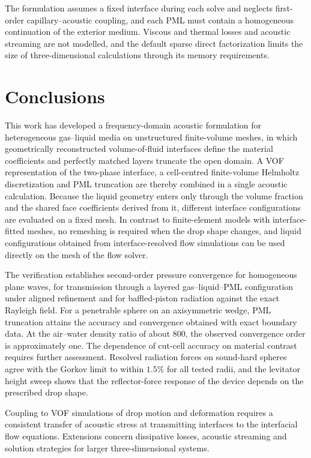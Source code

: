 \documentclass[final,12pt,nopreprintline,longtitle]{elsarticle}
\begin{document}
The formulation assumes a fixed interface during each solve and neglects
first-order capillary--acoustic coupling, and each PML must contain a
homogeneous continuation of the exterior medium.  Viscous and thermal
losses and acoustic streaming are not modelled, and the default sparse direct
factorization limits the size of three-dimensional calculations through its
memory requirements.

\section{Conclusions}
\label{sec:conclusions}

This work has developed a frequency-domain acoustic formulation for
heterogeneous gas--liquid media on unstructured finite-volume meshes, in which
geometrically reconstructed volume-of-fluid interfaces define the material
coefficients and perfectly matched layers truncate the open domain.  A VOF
representation of the two-phase interface, a cell-centred finite-volume
Helmholtz discretization and PML truncation are thereby combined in a single
acoustic calculation.  Because the liquid geometry enters only through the
volume fraction and the shared face coefficients derived from it, different
interface configurations are evaluated on a fixed mesh.  In contrast to
finite-element models with interface-fitted meshes, no remeshing is required
when the drop shape changes, and liquid configurations obtained from
interface-resolved flow simulations can be used directly on the mesh of the
flow solver.

The verification establishes second-order pressure convergence for
homogeneous plane waves, for transmission through a layered
gas--liquid--PML configuration under aligned refinement and for
baffled-piston radiation against the exact Rayleigh field.  For a penetrable
sphere on an axisymmetric wedge, PML truncation attains the accuracy and
convergence obtained with exact boundary data.  At the air--water density
ratio of about 800, the observed convergence order is approximately one.
The dependence of cut-cell accuracy on material contrast requires further
assessment.  Resolved radiation forces on sound-hard
spheres agree with the Gorkov limit to within $1.5\%$ for all tested radii,
and the levitator height sweep shows that the
reflector-force response of the device depends on the prescribed drop shape.

Coupling to VOF simulations of drop motion and deformation requires a
consistent transfer of acoustic stress at transmitting interfaces to the
interfacial flow equations.  Extensions concern dissipative losses, acoustic
streaming and solution strategies for larger three-dimensional systems.
\end{document}
